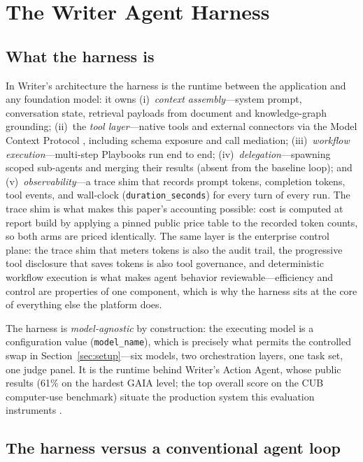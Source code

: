 \documentclass[11pt]{article}
\begin{document}
\section{The Writer Agent Harness}
\label{sec:harness}

\subsection{What the harness is}

In Writer's architecture the harness is the runtime between the application and any foundation model: it owns (i)~\emph{context assembly}---system prompt, conversation state, retrieval payloads from document and knowledge-graph grounding; (ii)~the \emph{tool layer}---native tools and external connectors via the Model Context Protocol \cite{mcp}, including schema exposure and call mediation; (iii)~\emph{workflow execution}---multi-step Playbooks run end to end; (iv)~\emph{delegation}---spawning scoped sub-agents and merging their results (absent from the baseline loop); and (v)~\emph{observability}---a trace shim that records prompt tokens, completion tokens, tool events, and wall-clock (\texttt{duration\_seconds}) for every turn of every run. The trace shim is what makes this paper's accounting possible: cost is computed at report build by applying a pinned public price table to the recorded token counts, so both arms are priced identically. The same layer is the enterprise control plane: the trace shim that meters tokens is also the audit trail, the progressive tool disclosure that saves tokens is also tool governance, and deterministic workflow execution is what makes agent behavior reviewable---efficiency and control are properties of one component, which is why the harness sits at the core of everything else the platform does.

The harness is \emph{model-agnostic} by construction: the executing model is a configuration value (\texttt{model\_name}), which is precisely what permits the controlled swap in Section~\ref{sec:setup}---six models, two orchestration layers, one task set, one judge panel. It is the runtime behind Writer's Action Agent, whose public results (61\% on the hardest GAIA level; the top overall score on the CUB computer-use benchmark) situate the production system this evaluation instruments \cite{actionagent}.

\subsection{The harness versus a conventional agent loop}
\end{document}
